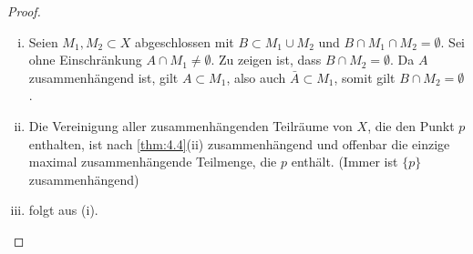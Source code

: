 \documentclass[a4paper,10pt]{scrartcl}
\begin{document}
\begin{proof}
 \begin{enumerate}[(i)]
  \item Seien $M_1,M_2\subset X$ abgeschlossen mit $B\subset M_1\cup M_2$ und $B\cap M_1\cap M_2=\emptyset$. 
Sei ohne Einschränkung $A\cap M_1\neq \emptyset$. Zu zeigen ist, dass $B\cap M_2=\emptyset$. Da $A$ zusammenhängend ist, gilt $A\subset M_1$, also auch $\bar A \subset M_1$, somit gilt $B\cap M_2=\emptyset$.
\item Die Vereinigung aller zusammenhängenden Teilräume von $X$, die den Punkt $p$ enthalten, ist nach \ref{thm:4.4}(ii)
 zusammenhängend und offenbar die einzige maximal zusammenhängende Teilmenge, die $p$ enthält. (Immer ist $\{p\}$ zusammenhängend)
\item folgt aus (i).
 \end{enumerate}
\end{proof}
\end{document}
